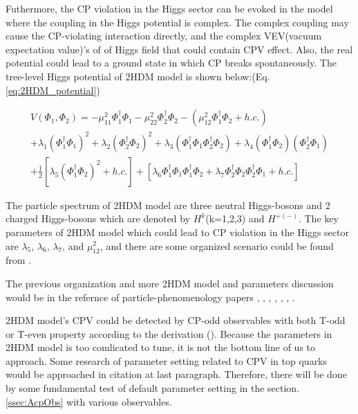			Futhermore, the CP violation in the Higgs sector can be evoked in the model where the coupling in the Higgs potential is complex. The complex coupling may cause the CP-violating interaction directly, and the complex VEV(vacuum expectation value)'s of of Higgs field that could contain CPV effect. Also, the real potential could lead to a ground state in which CP breaks spontaneously. The tree-level Higgs potential of 2HDM model is shown below:(Eq.\ref{eq:2HDM_potential})

			\begin{equation}
			\begin{split}
			V(\Phi_1, \Phi_2) = -\mu^2_{11} \Phi^{\dagger}_{1}\Phi_{1} -\mu^2_{22} \Phi^{\dagger}_{2}\Phi_{2} - ( \mu^2_{12} \Phi^{\dagger}_{1}\Phi_{2} + h.c.) \\
			+ \lambda_1(\Phi^{\dagger}_{1}\Phi_{1})^2 + \lambda_2(\Phi^{\dagger}_{2}\Phi_{2})^2 + \lambda_3(\Phi^{\dagger}_{1}\Phi_{1}\Phi^{\dagger}_{2}\Phi_{2}) + \lambda_4(\Phi^{\dagger}_{1}\Phi_{2})(\Phi^{\dagger}_{2}\Phi_{1})\\
			+ \frac{1}{2}[\lambda_5(\Phi^{\dagger}_{1}\Phi_{2})^2 + h.c. ] + [ \lambda_6 \Phi^{\dagger}_{1}\Phi_{1}\Phi^{\dagger}_{1}\Phi_{2} + \lambda_7 \Phi^{\dagger}_{2}\Phi_{2}\Phi^{\dagger}_{2}\Phi_{1} + h.c.]
			\label{eq:2HDM_potential}
			\end{split}
			\end{equation}
			\FloatBarrier

			The particle spectrum of 2HDM model are three neutral Higgs-bosons and 2 charged Higgs-bosons which are denoted by $H^{k}$(k=1,2,3) and $H^{+(-)}$. The key parameters of 2HDM model which could lead to CP violation in the Higgs sector are $\lambda_5$, $\lambda_6$, $\lambda_7$, and $\mu_{12}^2$, and there are some organized scenario could be found from \cite{Atwood:2000tu}.

			The previous organization and more 2HDM model and parameters discussion would be in the refernce of particle-phenomenology papers \cite{Atwood:2000tu}, \cite{ElKaffas:2006gdt}, \cite{Khater:2003wq}, \cite{Keus:2015hva}, \cite{Iguro:2019zlc}, \cite{Bernreuther:1993hq}, \cite{Bernreuther:1998qv}. 

			2HDM model's CPV could be detected by CP-odd observables with both T-odd or T-even property according to the derivation (\cite{Bernreuther:1993hq}). Because the parameters in 2HDM model is too comlicated to tune, it is not the bottom line of us to approach. Some research of parameter setting related to CPV in top quarks would be approached in citation at last paragraph. Therefore, there will be done by some fundamental test of default parameter setting in the section.\ref{ssec:AcpObs} with various observables.



